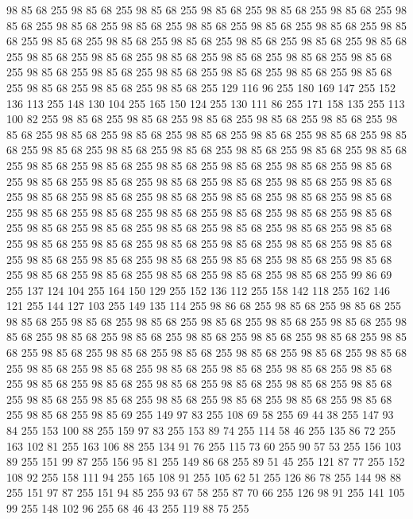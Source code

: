 98 85 68 255 98 85 68 255 98 85 68 255 98 85 68 255 98 85 68 255 98 85 68 255 98 85 68 255 98 85 68 255 98 85 68 255 98 85 68 255 98 85 68 255 98 85 68 255 98 85 68 255 98 85 68 255 98 85 68 255 98 85 68 255 98 85 68 255 98 85 68 255 98 85 68 255 98 85 68 255 98 85 68 255 98 85 68 255 98 85 68 255 98 85 68 255 98 85 68 255 98 85 68 255 98 85 68 255 98 85 68 255 98 85 68 255 98 85 68 255 98 85 68 255 98 85 68 255 98 85 68 255 98 85 68 255 129 116 96 255 180 169 147 255 152 136 113 255 148 130 104 255 165 150 124 255 130 111 86 255 171 158 135 255 113 100 82 255 98 85 68 255 98 85 68 255 98 85 68 255 98 85 68 255 98 85 68 255 98 85 68 255 98 85 68 255 98 85 68 255 98 85 68 255 98 85 68 255 98 85 68 255 98 85 68 255 98 85 68 255 98 85 68 255 98 85 68 255 98 85 68 255 98 85 68 255 98 85 68 255 98 85 68 255 98 85 68 255 98 85 68 255 98 85 68 255
98 85 68 255 98 85 68 255 98 85 68 255 98 85 68 255 98 85 68 255 98 85 68 255 98 85 68 255 98 85 68 255 98 85 68 255 98 85 68 255 98 85 68 255 98 85 68 255 98 85 68 255 98 85 68 255 98 85 68 255 98 85 68 255 98 85 68 255 98 85 68 255 98 85 68 255 98 85 68 255 98 85 68 255 98 85 68 255 98 85 68 255 98 85 68 255 98 85 68 255 98 85 68 255 98 85 68 255 98 85 68 255 98 85 68 255 98 85 68 255 98 85 68 255 98 85 68 255 98 85 68 255 98 85 68 255 98 85 68 255 98 85 68 255 98 85 68 255 98 85 68 255 98 85 68 255 98 85 68 255 98 85 68 255 98 85 68 255 98 85 68 255 99 86 69 255 137 124 104 255 164 150 129 255 152 136 112 255 158 142 118 255 162 146 121 255 144 127 103 255 149 135 114 255 98 86 68 255 98 85 68 255 98 85 68 255 98 85 68 255 98 85 68 255 98 85 68 255 98 85 68 255 98 85 68 255 98 85 68 255 98 85 68 255 98 85 68 255 98 85 68 255 98 85 68 255
98 85 68 255 98 85 68 255 98 85 68 255 98 85 68 255 98 85 68 255 98 85 68 255 98 85 68 255 98 85 68 255 98 85 68 255 98 85 68 255 98 85 68 255 98 85 68 255 98 85 68 255 98 85 68 255 98 85 68 255 98 85 68 255 98 85 68 255 98 85 68 255 98 85 68 255 98 85 68 255 98 85 68 255 98 85 68 255 98 85 68 255 98 85 68 255 98 85 68 255 98 85 68 255 98 85 68 255 98 85 68 255 98 85 69 255 149 97 83 255 108 69 58 255 69 44 38 255 147 93 84 255 153 100 88 255 159 97 83 255 153 89 74 255 114 58 46 255 135 86 72 255 163 102 81 255 163 106 88 255 134 91 76 255 115 73 60 255 90 57 53 255 156 103 89 255 151 99 87 255 156 95 81 255 149 86 68 255 89 51 45 255 121 87 77 255 152 108 92 255 158 111 94 255 165 108 91 255 105 62 51 255 126 86 78 255 144 98 88 255 151 97 87 255 151 94 85 255 93 67 58 255 87 70 66 255 126 98 91 255 141 105 99 255 148 102 96 255 68 46 43 255 119 88 75 255
